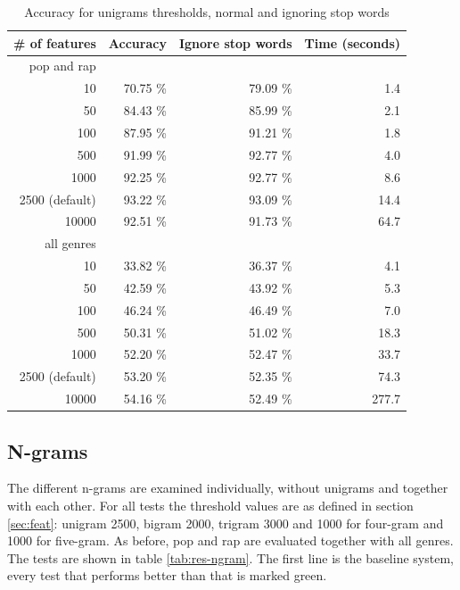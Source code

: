 \documentclass[a4paper, 12pt]{article}
\begin{document}
\begin{table}[h]
\begin{center}
    \begin{tabular}{| r | r | r | r |}
        \hline
        \# of features  & Accuracy & Ignore stop words  & Time (seconds) \\
        \hline
        pop and rap     &          &            &       \\ \hline
        10              & 70.75 \% & 79.09 \%   & 1.4   \\
        50              & 84.43 \% & 85.99 \%   & 2.1   \\
        100             & 87.95 \% & 91.21 \%   & 1.8   \\
        500             & 91.99 \% & 92.77 \%   & 4.0   \\
        1000            & 92.25 \% & 92.77 \%   & 8.6   \\
        2500 (default)  & 93.22 \% & 93.09 \%   & 14.4  \\
        10000           & 92.51 \% & 91.73 \%   & 64.7  \\
        \hline
        all genres      &          &            &       \\ \hline
        10              & 33.82 \% & 36.37 \%   & 4.1   \\
        50              & 42.59 \% & 43.92 \%   & 5.3   \\
        100             & 46.24 \% & 46.49 \%   & 7.0   \\
        500             & 50.31 \% & 51.02 \%   & 18.3  \\
        1000            & 52.20 \% & 52.47 \%   & 33.7  \\
        2500 (default)  & 53.20 \% & 52.35 \%   & 74.3  \\
        10000           & 54.16 \% & 52.49 \%   & 277.7 \\
        \hline
    \end{tabular}
    \caption{Accuracy for unigrams thresholds, normal and ignoring stop words}
    \label{tab:res-uni}
\end{center}
\end{table}

\subsection{N-grams}
The different n-grams are examined individually, without unigrams and together with each other.
For all tests the threshold values are as defined in section \ref{sec:feat}: unigram 2500, bigram 2000, trigram 3000 and 1000 for four-gram and 1000 for five-gram.
As before, pop and rap are evaluated together with all genres.
The tests are shown in table \ref{tab:res-ngram}.
The first line is the baseline system, every test that performs better than that is marked green.
\end{document}
